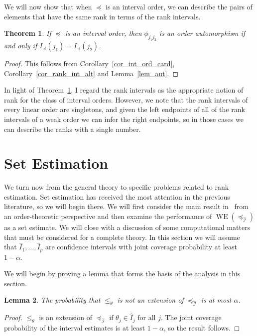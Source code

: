\documentclass[12pt]{article}
\newcommand{\iord}{{\preceq_{\hat{\mathcal{I}}}}}
\newcommand{\pord}{{\leqslant_{\theta}}}
\newcommand{\WE}[1]{\operatorname{WE}(#1)}
\newtheorem{theorem}{Theorem}
\numberwithin{theorem}{section}
\newtheorem{lemma}[theorem]{Lemma}
\begin{document}
We will now show that when $\preceq$ is an interval order, we can describe the pairs of elements that have the same rank in terms of the rank intervals.

\begin{theorem}
\label{thm_rank_int_rank}
If $\preceq$ is an interval order, then $\phi_{j_1j_2}$ is an order automorphism if and only if $I_\preceq(j_1) = I_\preceq(j_2)$.
\end{theorem}
\begin{proof}
This follows from Corollary~\ref{cor_int_ord_card}, Corollary~\ref{cor_rank_int_alt} and Lemma~\ref{lem_aut}.
\end{proof}

In light of Theorem~\ref{thm_rank_int_rank}, I regard the rank intervals as the appropriate notion of rank for the class of interval orders.  However, we note that the rank intervals of every linear order are singletons, and given the left endpoints of all of the rank intervals of a weak order we can infer the right endpoints, so in those cases we can describe the ranks with a single number.

\section{Set Estimation}
\label{sec_conf_set}

We turn now from the general theory to specific problems related to rank estimation.  Set estimation has received the most attention in the previous literature, so we will begin there.  We will first consider the main result in~\cite{klein2020jointCR} from an order-theoretic perspective and then examine the performance of $\WE{\iord}$ as a set estimate.  We will close with a discussion of some computational matters that must be considered for a complete theory.  In this section we will assume that $\hat{I}_1, \dots, \hat{I}_p$ are confidence intervals with joint coverage probability at least $1 - \alpha$.

We will begin by proving a lemma that forms the basis of the analysis in this section.

\begin{lemma}
\label{lem_cover_prob}
The probability that $\pord$ is not an extension of $\iord$ is at most $\alpha$.
\end{lemma}
\begin{proof}
$\pord$ is an extension of $\iord$ if $\theta_j \in \hat{I}_j$ for all $j$.  The joint coverage probability of the interval estimates is at least $1 - \alpha$, so the result follows.
\end{proof}
\end{document}
